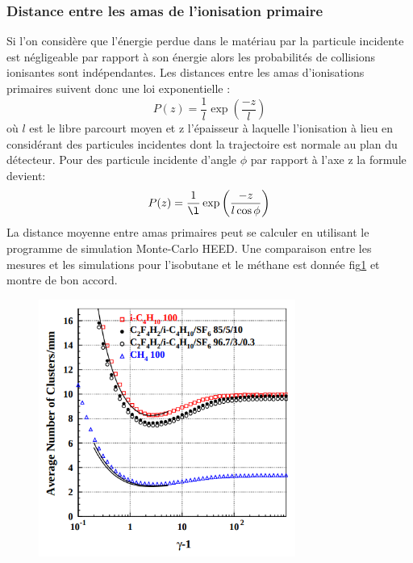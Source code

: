 \subsubsection{Distance entre les amas de l'ionisation primaire}
Si l'on considère que l'énergie perdue dans le matériau par la particule incidente est négligeable par rapport à son énergie alors les probabilités de collisions ionisantes sont indépendantes. Les distances entre les amas d'ionisations primaires suivent donc une loi exponentielle :
\begin{equation}
P(z)=\frac{1}{l}\exp\left(\frac{-z}{l}\right)
\end{equation} 
où $l$ est le libre parcourt moyen et z l'épaisseur à laquelle l'ionisation à lieu en considérant des particules incidentes dont la trajectoire est normale au plan du détecteur. Pour des particule incidente d'angle $\phi$ par rapport à l'axe z la formule devient:
\begin{equation}
P(z)=\frac{1}{\l}\exp\left(\frac{-z}{l\cos\phi}\right)
\end{equation}
La distance moyenne entre amas primaires peut se calculer en utilisant le programme de simulation Monte-Carlo HEED\cite{HEED}. Une comparaison entre les mesures et les simulations pour l'isobutane et le méthane est donnée fig\ref{lambda} et montre de bon accord\cite{2004NIMPA.518...86R}.  
\begin{figure}[h!]
	\centering
	\includegraphics[width=0.75\textwidth]{RPC/lambda.png}
	\label{lambda}
\end{figure}

